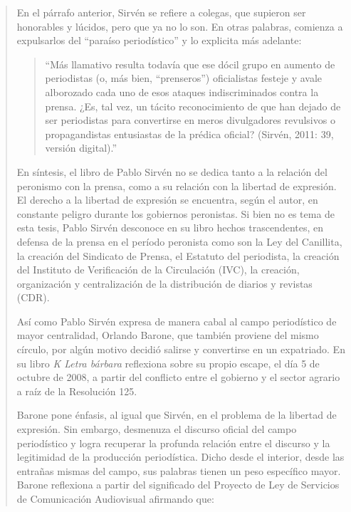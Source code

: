 \begin{quote}
En el párrafo anterior, Sirvén se refiere a colegas, que supieron ser honorables y lúcidos, pero que ya no lo son. En otras palabras, comienza a expulsarlos del ``paraíso periodístico'' y lo explicita más adelante:

\begin{quote}
	\enquote{Más llamativo resulta todavía que ese dócil grupo en aumento de periodistas (o, más bien, ``prenseros'') oficialistas festeje y avale alborozado cada uno de esos ataques indiscriminados contra la prensa. ¿Es, tal vez, un tácito reconocimiento de que han dejado de ser periodistas para convertirse en meros divulgadores revulsivos o propagandistas entusiastas de la prédica oficial? (Sirvén, 2011: 39, versión digital).}
\end{quote}


En síntesis, el libro de Pablo Sirvén no se dedica tanto a la relación del peronismo con la prensa, como a su relación con la libertad de expresión. El derecho a la libertad de expresión se encuentra, según el autor, en constante peligro durante los gobiernos peronistas. Si bien no es tema de esta tesis, Pablo Sirvén desconoce en su libro hechos trascendentes, en defensa de la prensa en el período peronista como son la Ley del Canillita, la creación del Sindicato de Prensa, el Estatuto del periodista, la creación del Instituto de Verificación de la Circulación (IVC), la creación, organización y centralización de la distribución de diarios y revistas (CDR).

Así como Pablo Sirvén expresa de manera cabal al campo periodístico de mayor centralidad, Orlando Barone, que también proviene del mismo círculo, por algún motivo decidió salirse y convertirse en un expatriado. En su libro \emph{K Letra bárbara }reflexiona sobre su propio escape, el día 5 de octubre de 2008, a partir del conflicto entre el gobierno y el sector agrario a raíz de la Resolución 125.

Barone pone énfasis, al igual que Sirvén, en el problema de la libertad de expresión. Sin embargo, desmenuza el discurso oficial del campo periodístico y logra recuperar la profunda relación entre el discurso y la legitimidad de la producción periodística. Dicho desde el interior, desde las entrañas mismas del campo, sus palabras tienen un peso específico mayor. Barone reflexiona a partir del significado del Proyecto de Ley de Servicios de Comunicación Audiovisual afirmando que:


\end{quote}
